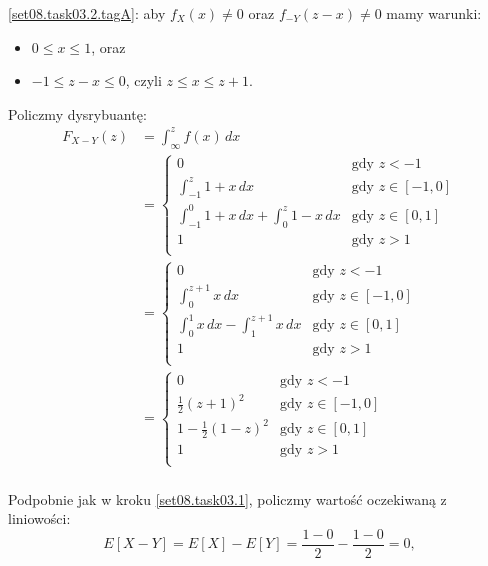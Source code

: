 \eqref{set08.task03.2.tagA}: aby \(f_X(x) \neq 0\) oraz \(f_{-Y}(z-x) \neq 0\)
mamy warunki:
\begin{itemize}
	\item \(0 \leq x \leq 1\), oraz
	\item \(-1 \leq z-x \leq 0\), czyli \(z \leq x \leq z+1\).
\end{itemize}

Policzmy dysrybuantę:
\begin{align*}
	F_{X-Y}(z)
	 & = \int_{\infty}^z f(x) \, dx                      \\
	 & = \begin{cases}
		     0
		      & \text{gdy \(z < -1\)}        \\
		     \int_{-1}^{z} 1+x \, dx
		      & \text{gdy \(z \in [-1, 0]\)} \\
		     \int_{-1}^{0} 1+x \, dx + \int_{0}^{z} 1-x \, dx
		      & \text{gdy \(z \in [0, 1]\)}  \\
		     1
		      & \text{gdy \(z > 1\)}         \\
	     \end{cases} \\
	 & = \begin{cases}
		     0
		      & \text{gdy \(z < -1\)}        \\
		     \int_{0}^{z+1} x \, dx
		      & \text{gdy \(z \in [-1, 0]\)} \\
		     \int_{0}^{1} x \, dx - \int_{1}^{z+1} x \, dx
		      & \text{gdy \(z \in [0, 1]\)}  \\
		     1
		      & \text{gdy \(z > 1\)}         \\
	     \end{cases}    \\
	 & = \begin{cases}
		     0
		      & \text{gdy \(z < -1\)}        \\
		     \frac{1}{2}(z+1)^2
		      & \text{gdy \(z \in [-1, 0]\)} \\
		     1 - \frac{1}{2} (1-z)^2
		      & \text{gdy \(z \in [0, 1]\)}  \\
		     1
		      & \text{gdy \(z > 1\)}         \\
	     \end{cases}    \\
\end{align*}

Podpobnie jak w kroku \ref{set08.task03.1}, policzmy wartość oczekiwaną z liniowości:
\[
	E[X-Y] = E[X] - E[Y] = \frac{1-0}{2} - \frac{1-0}{2} = \boxed{0},
\]

